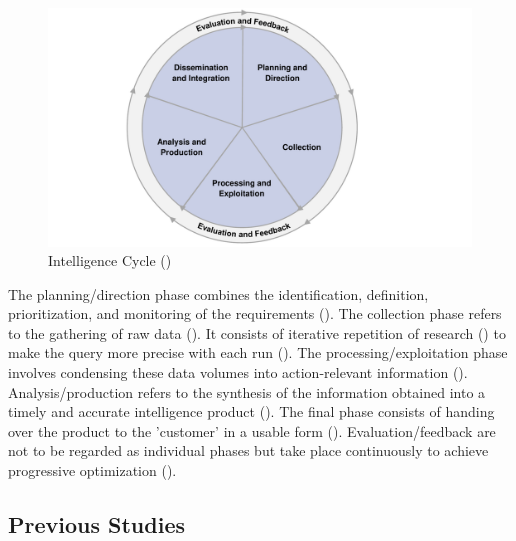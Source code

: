 \documentclass[10pt]{article}
\begin{document}
\begin{figure}[h]
    \centering
    \includegraphics[clip,width=0.6\linewidth]{PDF/images/crop_Intelligence Cycle}
    \caption{Intelligence Cycle (\textcite{JointChiefsofStaffU.S.Army.2013})}
    \label{fig: Intelligence Cycle}
\end{figure}

The planning/direction phase combines the identification, definition, prioritization, and monitoring
of the requirements (\cite{JointChiefsofStaffU.S.Army.2013}).
The collection phase refers to the gathering of raw data (\cite{CentralIntelligenceAgency.1987}).
It consists of iterative repetition of research
(\cite{NorthAtlanticTreatyOrganization.2001}) to make the query more precise with each run
(\cite{PastorGalindo.2020}). The processing/exploitation phase involves condensing
these data volumes into action-relevant information
(\cite{JointChiefsofStaffU.S.Army.2013}).
Analysis/production refers to the synthesis of the information obtained into a timely and accurate intelligence product
(\cite{NorthAtlanticTreatyOrganization.2001}).
The final phase consists of handing over the product to the 'customer' in a
usable form (\cite{CentralIntelligenceAgency.2023, Williams.2018}).
Evaluation/feedback are not to be regarded as individual phases
but take place continuously to achieve progressive optimization
(\cite{JointChiefsofStaffU.S.Army.2013, NorthAtlanticTreatyOrganization.2001}).

\subsection{Previous Studies}
\end{document}
